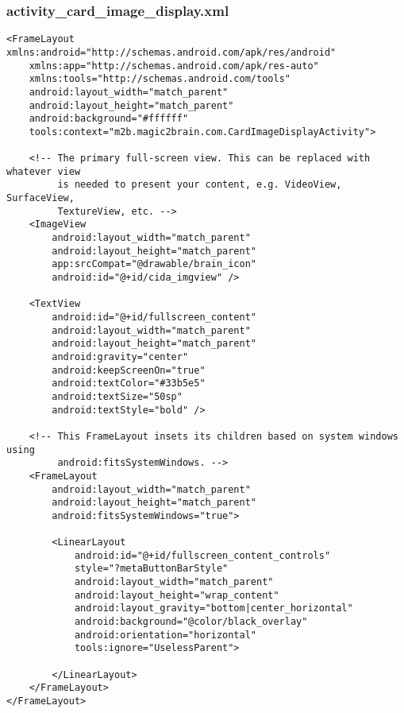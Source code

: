 \subsubsection{activity\_card\_image\_display.xml}
\begin{lstlisting}
<FrameLayout xmlns:android="http://schemas.android.com/apk/res/android"
    xmlns:app="http://schemas.android.com/apk/res-auto"
    xmlns:tools="http://schemas.android.com/tools"
    android:layout_width="match_parent"
    android:layout_height="match_parent"
    android:background="#ffffff"
    tools:context="m2b.magic2brain.com.CardImageDisplayActivity">

    <!-- The primary full-screen view. This can be replaced with whatever view
         is needed to present your content, e.g. VideoView, SurfaceView,
         TextureView, etc. -->
    <ImageView
        android:layout_width="match_parent"
        android:layout_height="match_parent"
        app:srcCompat="@drawable/brain_icon"
        android:id="@+id/cida_imgview" />

    <TextView
        android:id="@+id/fullscreen_content"
        android:layout_width="match_parent"
        android:layout_height="match_parent"
        android:gravity="center"
        android:keepScreenOn="true"
        android:textColor="#33b5e5"
        android:textSize="50sp"
        android:textStyle="bold" />

    <!-- This FrameLayout insets its children based on system windows using
         android:fitsSystemWindows. -->
    <FrameLayout
        android:layout_width="match_parent"
        android:layout_height="match_parent"
        android:fitsSystemWindows="true">

        <LinearLayout
            android:id="@+id/fullscreen_content_controls"
            style="?metaButtonBarStyle"
            android:layout_width="match_parent"
            android:layout_height="wrap_content"
            android:layout_gravity="bottom|center_horizontal"
            android:background="@color/black_overlay"
            android:orientation="horizontal"
            tools:ignore="UselessParent">

        </LinearLayout>
    </FrameLayout>
</FrameLayout>
\end{lstlisting}

